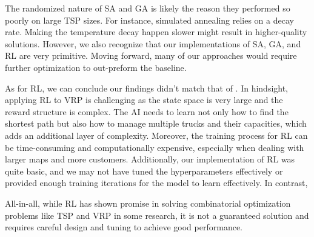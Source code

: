 \documentclass[conference]{IEEEtran}
\begin{document}
The randomized nature of SA and GA is likely the reason they performed so poorly on large TSP sizes. For instance, simulated annealing relies on a decay rate. Making the temperature decay happen slower might result in higher-quality solutions. However, we also recognize that our implementations of SA, GA, and RL are very primitive. Moving forward, many of our approaches would require further optimization to out-preform the baseline.

As for RL, we can conclude our findings didn't match that of \cite{Bello2017}. In hindsight, applying RL to VRP is challenging as the state space is very large and the reward structure is complex. The AI needs to learn not only how to find the shortest path but also how to manage multiple trucks and their capacities, which adds an additional layer of complexity. Moreover, the training process for RL can be time-consuming and computationally expensive, especially when dealing with larger maps and more customers. Additionally, our implementation of RL was quite basic, and we may not have tuned the hyperparameters effectively or provided enough training iterations for the model to learn effectively. In contrast,

All-in-all, while RL has shown promise in solving combinatorial optimization problems like TSP and VRP in some research, it is not a guaranteed solution and requires careful design and tuning to achieve good performance.



\end{document}
